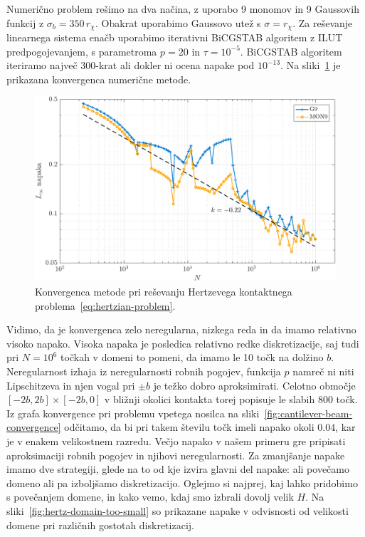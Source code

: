 \documentclass[12pt,a4paper,twoside]{article}
\theoremstyle{definition} %
\theoremstyle{plain} %
\numberwithin{equation}{section}
\newlength{\iw}
\begin{document}
Numerično problem rešimo na dva načina, z uporabo 9 monomov in 9 Gaussovih funkcij z $\sigma_b =
350\,r_\chi$. Obakrat uporabimo Gaussovo utež s $\sigma = r_\chi$. Za reševanje linearnega
sistema enačb uporabimo iterativni BiCGSTAB algoritem z ILUT predpogojevanjem, s parametroma $p=20$
in $\tau = 10^{-5}$. BiCGSTAB algoritem iteriramo največ 300-krat ali dokler ni ocena
napake pod $10^{-13}$. Na sliki~\ref{fig:hertz-convergence} je prikazana konvergenca numerične
metode.

\begin{figure}[!h]
  \centering
  \includegraphics[width=\iw]{images/hertzian_convergence.pdf}
  \caption[Konvergenca metode pri reševanju Hertzevega kontaktnega
  problema.]{Konvergenca metode pri reševanju Hertzevega kontaktnega
  problema~\eqref{eq:hertzian-problem}.}
  \label{fig:hertz-convergence}
\end{figure}

Vidimo, da je konvergenca zelo neregularna, nizkega reda in da imamo relativno visoko napako.
Visoka napaka je posledica relativno redke diskretizacije, saj tudi pri $N = 10^6$ točkah v domeni
to pomeni, da imamo le 10 točk na dolžino $b$. Neregularnost izhaja iz neregularnosti robnih
pogojev, funkcija $p$ namreč ni niti Lipschitzeva in njen vogal pri $\pm b$ je težko dobro
aproksimirati. Celotno območje $[-2b, 2b] \times [-2b, 0]$ v bližnji okolici kontakta torej popisuje
le slabih 800 točk. Iz grafa konvergence pri problemu vpetega nosilca na
sliki~\ref{fig:cantilever-beam-convergence} odčitamo, da bi pri takem številu točk imeli napako
okoli $0.04$, kar je v enakem velikostnem razredu. Večjo napako v našem primeru gre pripisati
aproksimaciji robnih pogojev in njihovi neregularnosti. Za zmanjšanje napake imamo dve strategiji,
glede na to od kje izvira glavni del napake: ali povečamo domeno ali pa izboljšamo diskretizacijo.
Oglejmo si najprej, kaj lahko pridobimo s povečanjem domene, in kako vemo, kdaj smo izbrali dovolj
velik $H$. Na sliki~\ref{fig:hertz-domain-too-small} so prikazane napake v odvisnosti od velikosti
domene pri različnih gostotah diskretizacij.
\end{document}
